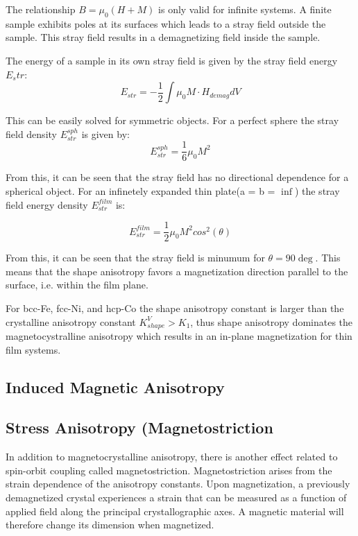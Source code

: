 \documentclass[12pt]{article} %
\begin{document}
The relationship $B = \mu_0\left (H + M\right )$ is only valid for infinite systems. A finite sample exhibits poles at its surfaces which leads to a stray field outside the sample. This stray field results in a demagnetizing field inside the sample.

The energy of a sample in its own stray field is given by the stray field energy $E_str$:
\begin{equation}
E_{str} = - \frac{1}{2} \int \mu_0 M \cdot H_{demag} dV
\end{equation}

This can be easily solved for symmetric objects. For a perfect sphere the stray field density $E_{str}^{sph}$ is given by:
\begin{equation}
E_{str}^{sph} = \frac{1}{6} \mu_0 M^2
\end{equation}

From this, it can be seen that the stray field has no directional dependence for a spherical object. For an infinetely expanded thin plate(a = b = $\inf$) the stray field energy density $E_{str}^{film}$ is:

\begin{equation}
E_{str}^{film} = \frac{1}{2} \mu_0 M^2 cos^2 \left ( \theta \right )
\end{equation}

From this, it can be seen that the stray field is minumum for $\theta = 90 \deg$. This means that the shape anisotropy favors a magnetization direction parallel to the surface, i.e. within the film plane.

For bcc-Fe, fcc-Ni, and hcp-Co the shape anisotropy constant is larger than the crystalline anisotropy constant $K_{shape}^V > K_1$, thus shape anisotropy dominates the magnetocystralline anisotropy which results in an in-plane magnetization for thin film systems.

\subsection{Induced Magnetic Anisotropy}

\subsection{Stress Anisotropy (Magnetostriction}
In addition to magnetocrystalline anisotropy, there is another effect related to spin-orbit coupling called magnetostriction. Magnetostriction arises from the strain dependence of the anisotropy constants. Upon magnetization, a previously demagnetized crystal experiences a strain that can be measured as a function of applied field along the principal crystallographic axes. A magnetic material will therefore change its dimension when magnetized.
\end{document}

